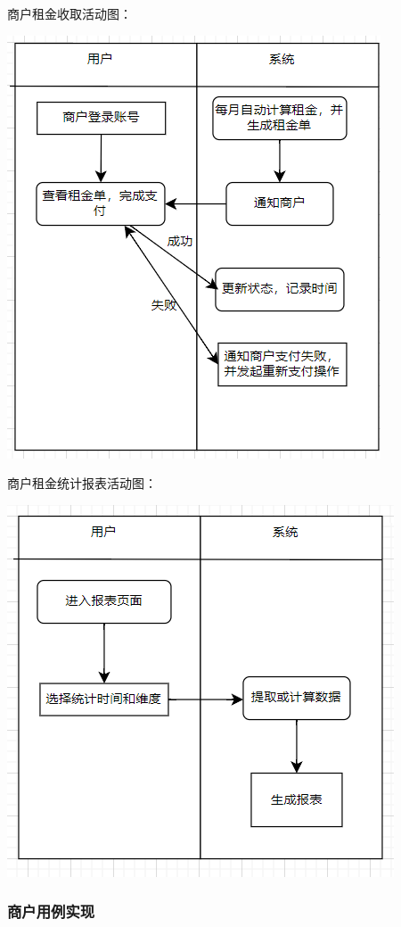 \documentclass[]{article}
\let\oldincludegraphics\includegraphics
\renewcommand{\includegraphics}[2][]{%
  \begin{center}\oldincludegraphics[#1]{#2}\end{center}%
}
\begin{document}
商户租金收取活动图：
\includegraphics{media/2.7/image31.png}

商户租金统计报表活动图：
\includegraphics{media/2.7/image32.png}

\hypertarget{ux5546ux6237ux7528ux4f8bux5b9eux73b0}{%
\subsubsection{商户用例实现}\label{ux5546ux6237ux7528ux4f8bux5b9eux73b0}}
\end{document}

